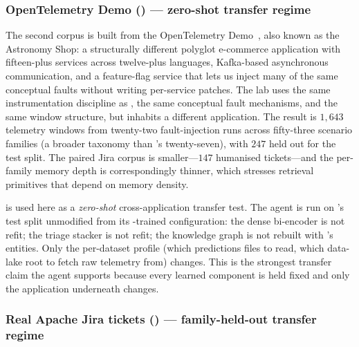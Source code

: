 \subsubsection{OpenTelemetry Demo (\dsotel{}) --- zero-shot transfer regime}
\label{sec:evaluation:datasets:otel}

The second corpus is built from the OpenTelemetry Demo~\cite{otel-demo}, also known as the Astronomy Shop: a structurally different polyglot e-commerce application with fifteen-plus services across twelve-plus languages, Kafka-based asynchronous communication, and a feature-flag service that lets us inject many of the same conceptual faults without writing per-service patches. The lab uses the same instrumentation discipline as \dsob{}, the same conceptual fault mechanisms, and the same window structure, but inhabits a different application. The result is $1{,}643$ telemetry windows from twenty-two fault-injection runs across fifty-three scenario families (a broader taxonomy than \dsob{}'s twenty-seven), with $247$ held out for the test split. The paired Jira corpus is smaller---$147$ humanised tickets---and the per-family memory depth is correspondingly thinner, which stresses retrieval primitives that depend on memory density.

\dsotel{} is used here as a \emph{zero-shot} cross-application transfer test. The agent is run on \dsotel{}'s test split unmodified from its \dsob{}-trained configuration: the dense bi-encoder is not refit; the triage stacker is not refit; the knowledge graph is not rebuilt with \dsotel{}'s entities. Only the per-dataset profile (which predictions files to read, which data-lake root to fetch raw telemetry from) changes. This is the strongest transfer claim the agent supports because every learned component is held fixed and only the application underneath changes.

\subsubsection{Real Apache Jira tickets (\dswol{}) --- family-held-out transfer regime}
\label{sec:evaluation:datasets:wol}

